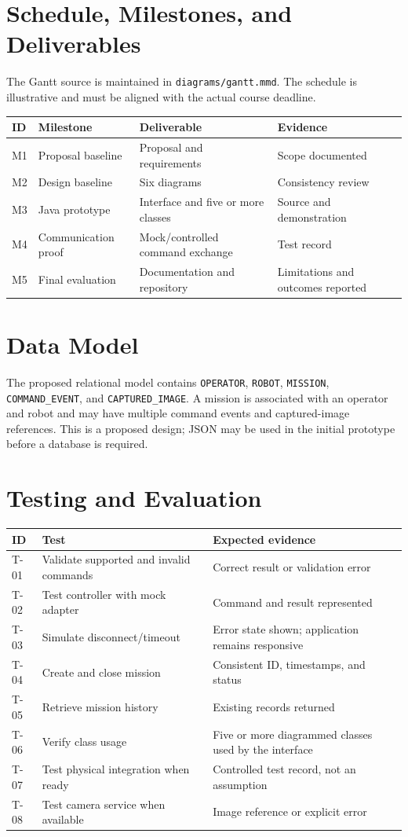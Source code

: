 \documentclass[12pt,a4paper]{article}
\begin{document}
\section{Schedule, Milestones, and Deliverables}
The Gantt source is maintained in \texttt{diagrams/gantt.mmd}. The schedule is illustrative and must be aligned with the actual course deadline.
\begin{longtable}{p{1.2cm}p{3.5cm}p{5.5cm}p{2cm}}\toprule
ID & Milestone & Deliverable & Evidence\\\midrule
M1 & Proposal baseline & Proposal and requirements & Scope documented\\
M2 & Design baseline & Six diagrams & Consistency review\\
M3 & Java prototype & Interface and five or more classes & Source and demonstration\\
M4 & Communication proof & Mock/controlled command exchange & Test record\\
M5 & Final evaluation & Documentation and repository & Limitations and outcomes reported\\\bottomrule
\end{longtable}

\section{Data Model}
The proposed relational model contains \texttt{OPERATOR}, \texttt{ROBOT}, \texttt{MISSION}, \texttt{COMMAND\_EVENT}, and \texttt{CAPTURED\_IMAGE}. A mission is associated with an operator and robot and may have multiple command events and captured-image references. This is a proposed design; JSON may be used in the initial prototype before a database is required.

\section{Testing and Evaluation}
\begin{longtable}{p{1.2cm}p{5cm}p{6cm}}\toprule
ID & Test & Expected evidence\\\midrule
T-01 & Validate supported and invalid commands & Correct result or validation error\\
T-02 & Test controller with mock adapter & Command and result represented\\
T-03 & Simulate disconnect/timeout & Error state shown; application remains responsive\\
T-04 & Create and close mission & Consistent ID, timestamps, and status\\
T-05 & Retrieve mission history & Existing records returned\\
T-06 & Verify class usage & Five or more diagrammed classes used by the interface\\
T-07 & Test physical integration when ready & Controlled test record, not an assumption\\
T-08 & Test camera service when available & Image reference or explicit error\\\bottomrule
\end{longtable}
\end{document}
